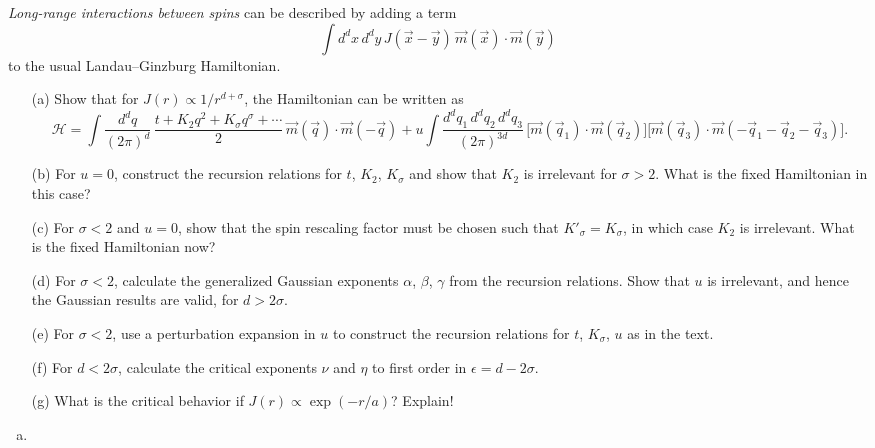 \begin{problem}
    \textit{Long-range interactions between spins} can be described by adding a term
    \[
        \int d^dx\,d^dy\,J(\vec{x}-\vec{y})\,\vec{m}(\vec{x})\cdot\vec{m}(\vec{y})
    \]
    to the usual Landau--Ginzburg Hamiltonian.

    \begin{enumerate}
        \item[(a)] Show that for $J(r) \propto 1/r^{d+\sigma}$, the Hamiltonian can be written as
        \[
            \mathcal{H} = \int\frac{d^dq}{(2\pi)^d}\,\frac{t + K_2q^2 + K_\sigma q^\sigma + \cdots}{2}\,\vec{m}(\vec{q})\cdot\vec{m}(-\vec{q}) + u\int\frac{d^dq_1\,d^dq_2\,d^dq_3}{(2\pi)^{3d}}\,\bigl[\vec{m}(\vec{q}_1)\cdot\vec{m}(\vec{q}_2)\bigr]\bigl[\vec{m}(\vec{q}_3)\cdot\vec{m}(-\vec{q}_1-\vec{q}_2-\vec{q}_3)\bigr].
        \]

        \item[(b)] For $u = 0$, construct the recursion relations for $t$, $K_2$, $K_\sigma$ and show that $K_2$ is irrelevant for $\sigma > 2$. What is the fixed Hamiltonian in this case?

        \item[(c)] For $\sigma < 2$ and $u = 0$, show that the spin rescaling factor must be chosen such that $K'_\sigma = K_\sigma$, in which case $K_2$ is irrelevant. What is the fixed Hamiltonian now?

        \item[(d)] For $\sigma < 2$, calculate the generalized Gaussian exponents $\alpha$, $\beta$, $\gamma$ from the recursion relations. Show that $u$ is irrelevant, and hence the Gaussian results are valid, for $d > 2\sigma$.

        \item[(e)] For $\sigma < 2$, use a perturbation expansion in $u$ to construct the recursion relations for $t$, $K_\sigma$, $u$ as in the text.

        \item[(f)] For $d < 2\sigma$, calculate the critical exponents $\nu$ and $\eta$ to first order in $\epsilon = d - 2\sigma$.

        \item[(g)] What is the critical behavior if $J(r) \propto \exp(-r/a)$? Explain!
    \end{enumerate}
\end{problem}

\begin{solution}
    \begin{enumerate}[(a)]
        \item
    \end{enumerate}
\end{solution}
